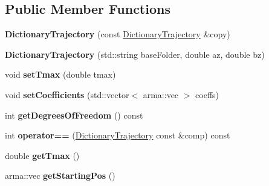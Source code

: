 \subsection*{Public Member Functions}
\begin{DoxyCompactItemize}
\item 
\hypertarget{classkukadu_1_1DictionaryTrajectory_a870747d3c8944989b77d1eef393c95aa}{{\bfseries Dictionary\-Trajectory} (const \hyperlink{classkukadu_1_1DictionaryTrajectory}{Dictionary\-Trajectory} \&copy)}\label{classkukadu_1_1DictionaryTrajectory_a870747d3c8944989b77d1eef393c95aa}

\item 
\hypertarget{classkukadu_1_1DictionaryTrajectory_ac86c379b5928d442991b7bf16a9dabc5}{{\bfseries Dictionary\-Trajectory} (std\-::string base\-Folder, double az, double bz)}\label{classkukadu_1_1DictionaryTrajectory_ac86c379b5928d442991b7bf16a9dabc5}

\item 
\hypertarget{classkukadu_1_1DictionaryTrajectory_ad6e50b83eca9a28f4f1f491aca0adced}{void {\bfseries set\-Tmax} (double tmax)}\label{classkukadu_1_1DictionaryTrajectory_ad6e50b83eca9a28f4f1f491aca0adced}

\item 
\hypertarget{classkukadu_1_1DictionaryTrajectory_a0a8f57d5f4f0928a86e33c72b4b13b72}{void {\bfseries set\-Coefficients} (std\-::vector$<$ arma\-::vec $>$ coeffs)}\label{classkukadu_1_1DictionaryTrajectory_a0a8f57d5f4f0928a86e33c72b4b13b72}

\item 
\hypertarget{classkukadu_1_1DictionaryTrajectory_adda7370fe6219f6ebc338dfd069eb82d}{int {\bfseries get\-Degrees\-Of\-Freedom} () const }\label{classkukadu_1_1DictionaryTrajectory_adda7370fe6219f6ebc338dfd069eb82d}

\item 
\hypertarget{classkukadu_1_1DictionaryTrajectory_a7555c07b4021fc812273ccbcfbf687e4}{int {\bfseries operator==} (\hyperlink{classkukadu_1_1DictionaryTrajectory}{Dictionary\-Trajectory} const \&comp) const }\label{classkukadu_1_1DictionaryTrajectory_a7555c07b4021fc812273ccbcfbf687e4}

\item 
\hypertarget{classkukadu_1_1DictionaryTrajectory_ac712e5e1bb0ffdeff574b215adbf483c}{double {\bfseries get\-Tmax} ()}\label{classkukadu_1_1DictionaryTrajectory_ac712e5e1bb0ffdeff574b215adbf483c}

\item 
\hypertarget{classkukadu_1_1DictionaryTrajectory_a271c61b9017bc3bab7c8743197680310}{arma\-::vec {\bfseries get\-Starting\-Pos} ()}\label{classkukadu_1_1DictionaryTrajectory_a271c61b9017bc3bab7c8743197680310}


\end{DoxyCompactItemize}
